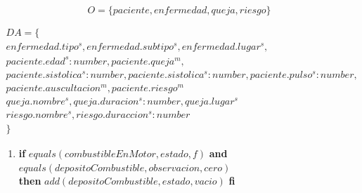 \documentclass[10pt, a4paper,spanish]{article}
\begin{document}
		\begin{equation*}
			O = \{paciente, enfermedad, queja, riesgo \}
		\end{equation*}

		\begin{multline*}
			DA = \{ \\
				enfermedad.tipo^s, enfermedad.subtipo^s, enfermedad.lugar^s, \\
				paciente.edad^s:number, paciente.queja^m, \\
				paciente.sistolica^s:number, paciente.sistolica^s:number, paciente.pulso^s:number, \\
				paciente.auscultacion^m, paciente.riesgo^m \\
				queja.nombre^s, queja.duracion^s:number, queja.lugar^s\\
				riesgo.nombre^s, riesgo.duraccion^s:number\\
			\}
		\end{multline*}


		\begin{enumerate}[label={\textbf{R\theenumi:}}]

			\item
				\textbf{if} $equals(combustibleEnMotor, estado, f)$ \textbf{and} $equals(depositoCombustible, observacion, cero)$ \\
				\textbf{then} $add(depositoCombustible, estado, vacio)$ \textbf{fi}

		\end{enumerate}
\end{document}
